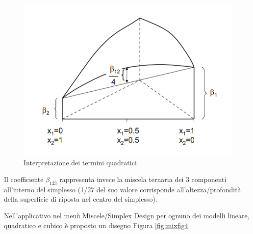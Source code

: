 \documentclass[
  11pt,
]{book}
\begin{document}
\begin{figure}[ht]

{\centering \includegraphics[width=1\linewidth]{Immagini/Mixt/03_coeff_quadr} 

}

\caption{Interpretazione dei termini quadratici\label{fig3}}\label{fig:mixfig3}
\end{figure}

Il coefficiente \(\beta_{123}\) rappresenta invece la miscela ternaria dei 3 componenti all'interno del simplesso (1/27 del suo valore corrisponde all'altezza/profondità della superficie di riposta nel centro del simplesso).

Nell'applicativo nel menù Miscele/Simplex Design per ognuno dei modelli lineare, quadratico e cubico è proposto un disegno Figura \ref{fig:mixfig4}
\end{document}
